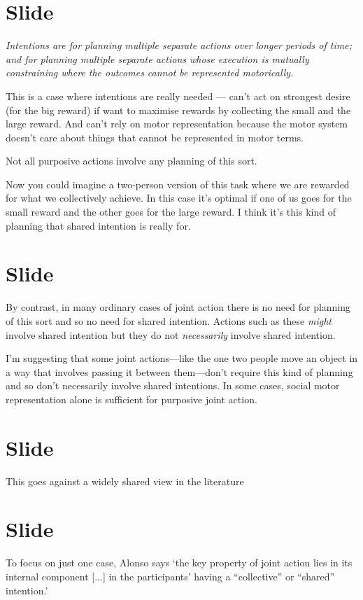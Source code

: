 \documentclass[12pt,\papersize]{extarticle}
\begin{document}
\section{Slide}
\emph{Intentions are for planning multiple separate actions over longer periods of time; and for planning multiple separate actions whose execution is mutually constraining where the outcomes cannot be represented motorically.}

This is a case where intentions are really needed --- can’t act on strongest desire (for the big reward) if want to maximise rewards by collecting the small and the large reward.
And can’t rely on motor representation because the motor system doesn’t care about things that cannot be represented in motor terms.

Not all purposive actions involve any planning of this sort. 

Now you could imagine a two-person version of this task where we are rewarded for what we collectively achieve.  In this case it’s optimal if one of us goes for the small reward and the other goes for the large reward.  I think it’s this kind of planning that shared intention is really for.



\section{Slide}
By contrast, in many ordinary cases of joint action there is no need for planning of this sort and so no need for shared intention.  Actions such as these \emph{might} involve shared intention but they do not \emph{necessarily} involve shared intention.

I’m suggesting that some joint actions---like the one two people move an object in a way that involves passing it between them---don’t require this kind of planning and so don’t necessarily involve shared intentions.
In some cases, social motor representation alone is sufficient for purposive joint action.



\section{Slide}
This goes against a widely shared view in the literature



\section{Slide}
To focus on just one case, Alonso says ‘the key property of joint action lies in its internal component [...] in the participants’ having a “collective” or “shared” intention.’ \citep[pp.\ 444-5]{alonso_shared_2009}
\end{document}
